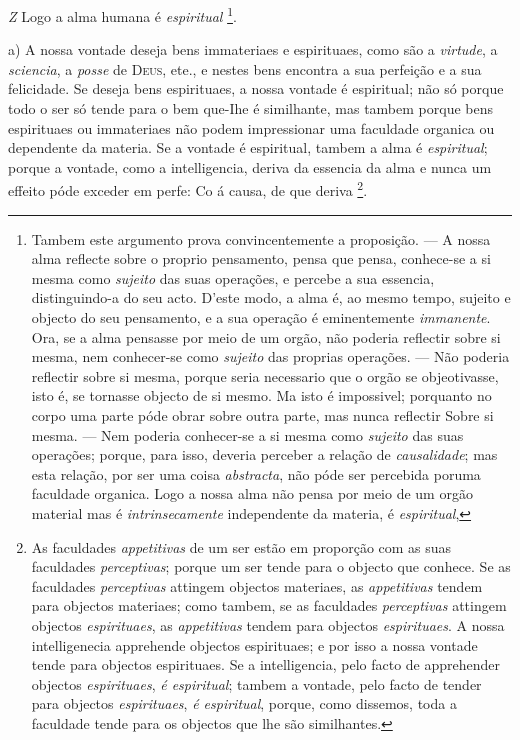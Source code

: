 \emph{Z} Logo a alma humana é \emph{espiritual} \footnote{Tambem este argumento prova convincentemente a proposição. --- A nossa alma reflecte sobre o proprio pensamento, pensa que pensa, conhece-se a si mesma como \emph{sujeito} das suas operações, e percebe a sua essencia, distinguindo-a do seu acto. D'este modo, a alma é, ao mesmo tempo, sujeito e objecto do seu pensamento, e a sua operação é eminentemente \emph{immanente}. Ora, se a alma pensasse por meio de um orgão, não poderia reflectir sobre si mesma, nem conhecer-se como \emph{sujeito} das proprias operações. --- Não poderia reflectir sobre si mesma, porque seria necessario que o orgão se objeotivasse, isto é, se tornasse objecto de si mesmo. Ma isto é impossivel; porquanto no corpo uma parte póde obrar sobre outra parte, mas nunca reflectir Sobre si mesma. --- Nem poderia conhecer-se a si mesma como \emph{sujeito} das suas operações; porque, para isso, deveria perceber a relação de \emph{causalidade}; mas esta relação, por ser uma coisa \emph{abstracta}, não póde ser percebida poruma faculdade organica. Logo a nossa alma não pensa por meio de um orgão material mas é \emph{intrinsecamente} independente da materia, é \emph{espiritual},}.


  

a) A nossa vontade deseja bens immateriaes e espirituaes, como são a \emph{virtude}, a \emph{sciencia}, a \emph{posse} de \textsc{Deus}, ete., e nestes bens encontra a sua perfeição e a sua felicidade. Se deseja bens espirituaes, a nossa vontade é espiritual; não só porque todo o ser só tende para o bem que-Ihe é similhante, mas tambem porque bens espirituaes ou immateriaes não podem impressionar uma faculdade organica ou dependente da materia. Se a vontade é espiritual, tambem a alma é \emph{espiritual}; porque a vontade, como a intelligencia, deriva da essencia da alma e nunca um effeito póde exceder em perfe: Co á causa, de que deriva \footnote{As faculdades \emph{appetitivas} de um ser estão em proporção com as suas faculdades \emph{perceptivas}; porque um ser tende para o objecto que conhece. Se as faculdades \emph{perceptivas} attingem objectos materiaes, as \emph{appetitivas} tendem para objectos materiaes; como tambem, se as faculdades \emph{perceptivas} attingem objectos \emph{espirituaes}, as \emph{appetitivas} tendem para objectos \emph{espirituaes}. A nossa intelligenecia apprehende objectos espirituaes; e por isso a nossa vontade tende para objectos espirituaes. Se a intelligencia, pelo facto de apprehender objectos \emph{espirituaes}, \emph{é espiritual}; tambem a vontade, pelo facto de tender para objectos \emph{espirituaes}, \emph{é espiritual}, porque, como dissemos, toda a faculdade tende para os objectos que lhe são similhantes.}.

